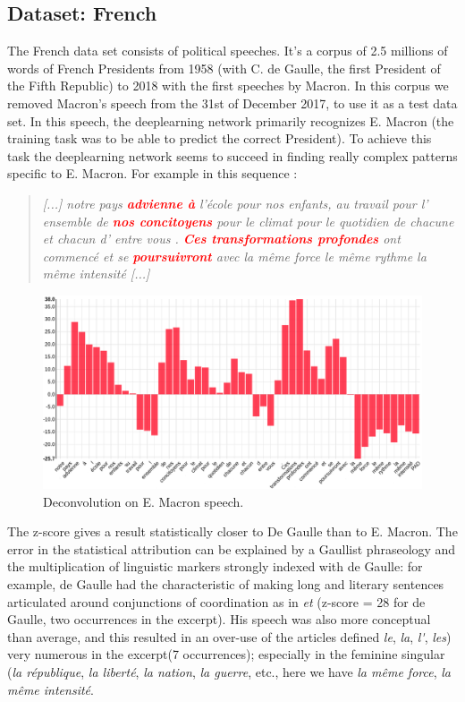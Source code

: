 \subsection{Dataset: French}

The French data set consists of political speeches. It's a corpus of 2.5 millions of words of French Presidents from 1958 (with C. de Gaulle, the first President of the Fifth Republic) to 2018 with the first speeches by Macron. In this corpus we removed Macron's speech from the 31st of December 2017, to use it as a test data set. In this speech, the deeplearning network primarily recognizes E. Macron (the training task was to be able to predict the correct President). To achieve this task the deeplearning network seems to succeed in finding really complex patterns specific to E. Macron. For example in this sequence :

\begin{quote}
\textit{[...] notre pays \textcolor{red}{\textbf{advienne à}} l'école pour nos enfants, au travail pour l' ensemble de \textcolor{red}{\textbf{nos concitoyens}} pour le climat pour le quotidien de chacune et chacun d' entre vous . \textcolor{red}{\textbf{Ces transformations profondes}} ont commencé et se \textcolor{red}{\textbf{poursuivront}} avec la même force le même rythme la même intensité [...]} 
\end{quote}

\begin{figure}[h]
\begin{center}
\includegraphics[width=16cm]{img/macron_activation.png}
\caption{Deconvolution on E. Macron speech.}
\label{macron_activation}
\end{center}
\end{figure}

The z-score gives a result statistically closer to De Gaulle than to E. Macron. The error in the statistical attribution can be explained by a Gaullist phraseology and the multiplication of linguistic markers strongly indexed with de Gaulle: for example, de Gaulle had the characteristic of making long and literary sentences articulated around conjunctions of coordination as in \textit{et} (z-score = 28 for de Gaulle, two occurrences in the excerpt). His speech was also more conceptual than average, and this resulted in an over-use of the articles defined \textit{le}, \textit{la}, \textit{l\'}, \textit{les}) very numerous in the excerpt(7 occurrences); especially in the feminine singular (\textit{la république}, \textit{la liberté}, \textit{la nation}, \textit{la guerre}, etc., here we have \textit{la même force}, \textit{la même intensité}.


